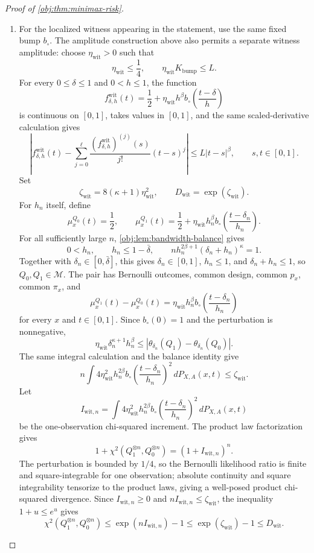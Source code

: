 \documentclass[11pt]{article}
\begin{document}
\begin{proof}[Proof of \cref{obj:thm:minimax-risk}]
\begin{enumerate}
\item For the localized witness appearing in the statement, use the same fixed bump
\(b_\circ\).  The amplitude construction above also permits a separate witness
amplitude: choose \(\eta_{\mathrm{wit}}>0\) such that
\[
\eta_{\mathrm{wit}}\le\frac14,
\qquad
\eta_{\mathrm{wit}}K_{\mathrm{bump}}\le L .
\]
For every \(0\le\delta\le1\) and \(0<h\le1\), the function
\[
f_{\delta,h}^{\mathrm{wit}}(t)
=
\frac12+\eta_{\mathrm{wit}} h^\beta b_\circ\!\left(\frac{t-\delta}{h}\right)
\]
is continuous on \([0,1]\), takes values in \([0,1]\), and the same scaled-derivative
calculation gives
\[
\left|
f_{\delta,h}^{\mathrm{wit}}(t)
-
\sum_{j=0}^{\ell}
\frac{(f_{\delta,h}^{\mathrm{wit}})^{(j)}(s)}{j!}(t-s)^j
\right|
\le
L|t-s|^\beta,
\qquad s,t\in[0,1].
\]
Set
\[
\zeta_{\mathrm{wit}}=8(\kappa+1)\eta_{\mathrm{wit}}^2,
\qquad
D_{\mathrm{wit}}=\exp(\zeta_{\mathrm{wit}}).
\]
For \(h_n\) itself, define
\[
\mu_x^{Q_0}(t)=\frac12,
\qquad
\mu_x^{Q_1}(t)=\frac12+
 \eta_{\mathrm{wit}} h_n^\beta b_\circ\!\left(\frac{t-\delta_n}{h_n}\right).
\]
For all sufficiently large \(n\), \cref{obj:lem:bandwidth-balance} gives
\[
0<h_n,
\qquad
h_n\le1-\bar\delta,
\qquad
n h_n^{2\beta+1}(\delta_n+h_n)^\kappa=1 .
\]
Together with \(\delta_n\in[0,\bar\delta]\), this gives \(\delta_n\in[0,1]\),
\(h_n\le1\), and \(\delta_n+h_n\le1\), so \(Q_0,Q_1\in\mathcal M\).  The pair has
Bernoulli outcomes, common design, common \(p_x\), common \(\pi_x\), and
\[
\mu_x^{Q_1}(t)-\mu_x^{Q_0}(t)
=
\eta_{\mathrm{wit}} h_n^\beta b_\circ\!\left(\frac{t-\delta_n}{h_n}\right)
\]
for every \(x\) and \(t\in[0,1]\).  Since \(b_\circ(0)=1\) and the perturbation is
nonnegative,
\[
\eta_{\mathrm{wit}}\delta_n^{\kappa+1}h_n^\beta
\le
\left|
\theta_{\delta_n}(Q_1)-\theta_{\delta_n}(Q_0)
\right|.
\]
The same integral calculation and the balance identity give
\[
n\int 4\eta_{\mathrm{wit}}^2h_n^{2\beta}
 b_\circ\!\left(\frac{t-\delta_n}{h_n}\right)^2
\,dP_{X,A}(x,t)
\le
\zeta_{\mathrm{wit}}.
\]
Let
\[
I_{\mathrm{wit},n}
=
\int 4\eta_{\mathrm{wit}}^2h_n^{2\beta}
 b_\circ\!\left(\frac{t-\delta_n}{h_n}\right)^2
\,dP_{X,A}(x,t)
\]
be the one-observation chi-squared increment.  The product law factorization gives
\[
1+\chi^2(Q_1^{\otimes n},Q_0^{\otimes n})
=
(1+I_{\mathrm{wit},n})^n .
\]
The perturbation is bounded by \(1/4\), so the Bernoulli likelihood ratio is finite and
square-integrable for one observation; absolute continuity and square integrability tensorize to
the product laws, giving a well-posed product chi-squared divergence.  Since
\(I_{\mathrm{wit},n}\ge0\) and \(nI_{\mathrm{wit},n}\le\zeta_{\mathrm{wit}}\), the inequality
\(1+u\le e^u\) gives
\[
\chi^2(Q_1^{\otimes n},Q_0^{\otimes n})
\le
\exp(nI_{\mathrm{wit},n})-1
\le
\exp(\zeta_{\mathrm{wit}})-1
\le
D_{\mathrm{wit}} .
\]


\end{enumerate}
\end{proof}
\end{document}

